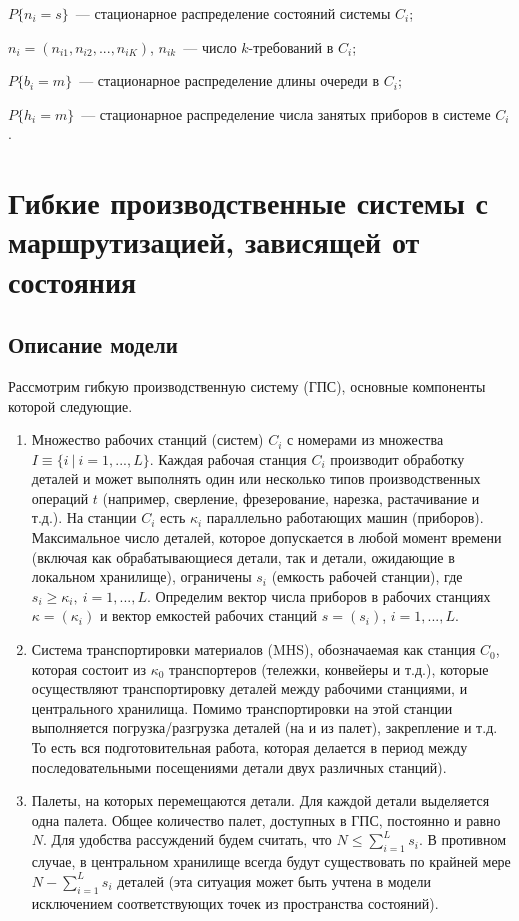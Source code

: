 $P\{n_i=s\}$~--- стационарное распределение состояний системы $C_i$;

$n_i=(n_{i1}, n_{i2},...,n_{iK})$, $n_{ik}$~--- число $k$-требований в $C_i$;

$P\{b_i=m\}$~--- стационарное распределение длины очереди в $C_i$;

$P\{h_i=m\}$~--- стационарное распределение числа занятых приборов в системе $C_i$.




\section{Гибкие производственные системы с маршрутизацией, зависящей от состояния}
\label{sec:FMS}

\subsection{Описание модели}
\label{subsec:FMS_specification}

Рассмотрим гибкую производственную систему (ГПС), основные компоненты которой следующие.

\begin{enumerate}
\item Множество рабочих станций (систем) $C_i$ с номерами из множества $I \equiv \{ i ~|~ i=1,...,L \}$. Каждая рабочая станция $C_i$ производит обработку деталей и может выполнять один или несколько типов производственных операций $t$ (например, сверление, фрезерование, нарезка, растачивание и т.д.). На станции $C_i$ есть $\kappa_i$ параллельно работающих машин (приборов). Максимальное число деталей, которое допускается в любой момент времени (включая как обрабатывающиеся детали, так и детали, ожидающие в локальном хранилище), ограничены $s_i$ (емкость рабочей станции), где $s_i \geqslant \kappa_i, ~ i=1,...,L$. Определим вектор числа приборов в рабочих станциях $\kappa = (\kappa_i)$ и вектор емкостей рабочих станций $s = (s_i)$, $i=1,...,L$.

\item Система транспортировки материалов (MHS), обозначаемая как станция $C_0$, которая состоит из $\kappa_0$ транспортеров (тележки, конвейеры и т.д.), которые осуществляют транспортировку деталей между рабочими станциями, и центрального хранилища. Помимо транспортировки на этой станции выполняется погрузка/разгрузка деталей (на и из палет), закрепление и т.д. То есть вся подготовительная работа, которая делается в период между последовательными посещениями детали двух различных станций).

\item Палеты, на которых перемещаются детали. Для каждой детали выделяется одна палета. Общее количество палет, доступных в ГПС, постоянно и равно $N$. Для удобства рассуждений будем считать, что $N \leqslant \sum\limits_{i=1}^L s_i$. В противном случае, в центральном хранилище всегда будут существовать по крайней мере $N - \sum\limits_{i=1}^L s_i$ деталей (эта ситуация может быть учтена в модели исключением соответствующих точек из пространства состояний).
\end{enumerate}

